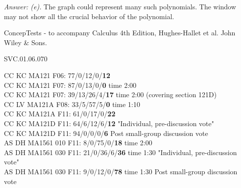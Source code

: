 {\it Answer: (e).} 
The graph could represent many such polynomials. The window may not show all the crucial behavior of the
polynomial.

ConcepTests - to accompany Calculus 4th Edition, Hughes-Hallet et al. John Wiley \& Sons.

SVC.01.06.070

CC KC MA121 F06: 77/0/12/0/{\bf 12} \\
CC KC MA121 F07: 87/0/13/0/{\bf 0} time 2:00 \\
CC KC MA121 F07: 39/13/26/4/{\bf 17} time 2:00 (covering section 121D)\\
CC LV MA121A F08: 33/5/57/5/{\bf 0} time 1:10\\
CC KC MA121A F11: 61/0/17/0/{\bf22}  \\
CC KC MA121D F11: 64/6/12/6/{\bf12} "Individual, pre-discussion vote" \\
CC KC MA121D F11: 94/0/0/0/{\bf6} Post small-group discussion vote \\
AS DH MA1561 010 F11: 8/0/75/0/{\bf18} time 2:00  \\
AS DH MA1561 030 F11: 21/0/36/6/{\bf36} time 1:30 "Individual, pre-discussion vote" \\
AS DH MA1561 030 F11: 9/0/12/0/{\bf78} time 1:30 Post small-group discussion vote \\
